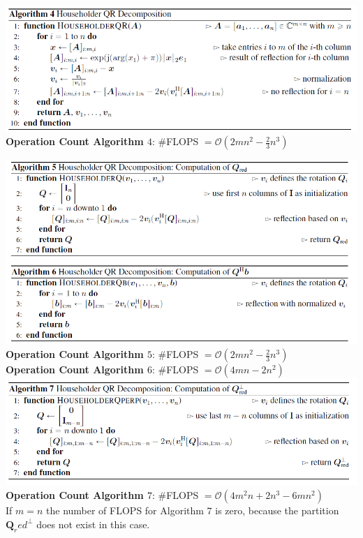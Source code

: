 \documentclass[english]{latex4ei/latex4ei_sheet}
\begin{document}
\begin{sectionbox}
    \includegraphics[width=\textwidth]{img/householder_QR.png}
    \textbf{Operation Count Algorithm $4$}: \#FLOPS $=\mathcal{O}(2mn^2 - \frac{2}{3}n^3)$
\end{sectionbox}
\begin{sectionbox}

    \includegraphics[width=\textwidth]{img/householder_QR_further.png}\\

    \textbf{Operation Count Algorithm $5$}: \#FLOPS $=\mathcal{O}(2mn^2-\frac{2}{3}n^3)$\\

    \textbf{Operation Count Algorithm $6$}: \#FLOPS $=\mathcal{O}(4mn-2n^2)$\\

    \includegraphics[width=\textwidth]{img/householder_QR_Qperp.png}\\

    \textbf{Operation Count Algorithm $7$}: \#FLOPS $=\mathcal{O}(4m^2n+2n^3-6mn^2)$\\
    If $m=n$ the number of FLOPS for Algorithm $7$ is zero, because the partition $\mathbf{Q}_red^\perp$ does not exist in this case.
\end{sectionbox}
\end{document}
